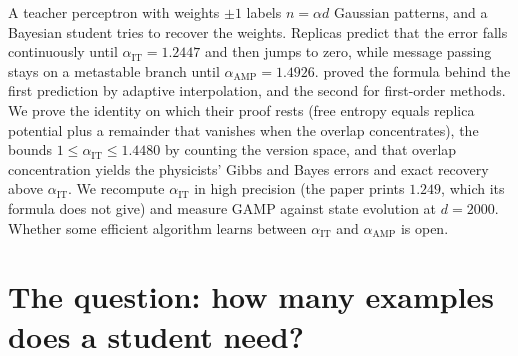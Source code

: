 \newcommand{\glmV}{\mathcal{V}}
\newcommand{\glmfrs}{f_{\mathrm{RS}}}
\newcommand{\glmIT}{\alpha_{\mathrm{IT}}}
\newcommand{\glmAMP}{\alpha_{\mathrm{AMP}}}
\newcommand{\glmann}{\alpha_{\mathrm{ann}}}
\newcommand{\glmPout}{P_{\mathrm{out}}}
\newcommand{\glmB}{\varepsilon_{\mathrm{B}}}
\newcommand{\glmG}{\varepsilon_{\mathrm{G}}}
\newcommand{\glmZout}{\cZ_{\mathrm{out}}}

\begin{refsection}

\begin{chaptersummary}
A teacher perceptron with weights $\pm1$ labels $n=\alpha d$ Gaussian patterns, and a Bayesian student tries to recover the weights. Replicas predict that the error falls continuously until $\glmIT=1.2447$ and then jumps to zero, while message passing stays on a metastable branch until $\glmAMP=1.4926$. \Textcite{BarbierEtAl2019} proved the formula behind the first prediction by adaptive interpolation, and \textcite{CelentanoMontanariWu2020} the second for first-order methods. We prove the identity on which their proof rests (free entropy equals replica potential plus a remainder that vanishes when the overlap concentrates), the bounds $1\le\glmIT\le1.4480$ by counting the version space, and that overlap concentration yields the physicists' Gibbs and Bayes errors and exact recovery above $\glmIT$. We recompute $\glmIT$ in high precision (the paper prints $1.249$, which its formula does not give) and measure GAMP against state evolution at $d=2000$. Whether some efficient algorithm learns between $\glmIT$ and $\glmAMP$ is open.
\end{chaptersummary}

\section{The question: how many examples does a student need?}\label{sec:glm:question}


\end{refsection}
